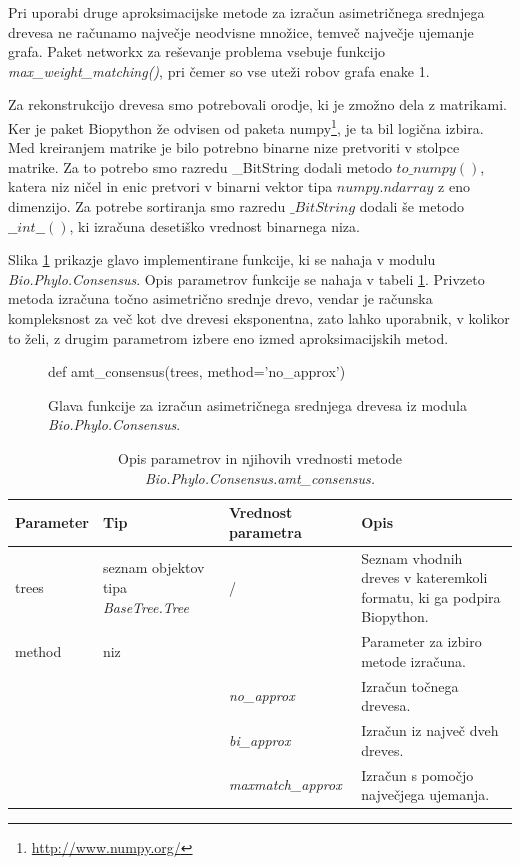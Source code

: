 \documentclass[a4paper, 12pt]{book}
\begin{document}
Pri uporabi druge aproksimacijske metode za izračun asimetričnega srednjega drevesa ne računamo največje neodvisne množice, 
temveč največje ujemanje grafa. Paket networkx za reševanje problema vsebuje funkcijo {\it max\_weight\_matching()}, pri čemer
so vse uteži robov grafa enake 1.

Za rekonstrukcijo drevesa smo potrebovali orodje, ki je zmožno dela z matrikami. Ker je paket Biopython že odvisen od paketa numpy\footnote{\url{http://www.numpy.org/}}, je ta bil logična izbira. Med kreiranjem matrike je bilo potrebno binarne nize pretvoriti v stolpce matrike. Za to potrebo smo razredu \_BitString dodali metodo $to\_numpy()$, katera niz ničel in enic pretvori v binarni vektor tipa $numpy.ndarray$ z eno dimenzijo. Za potrebe sortiranja smo razredu $\_BitString$ dodali še metodo $\_\_int\_\_()$, ki izračuna desetiško vrednost binarnega niza.

Slika \ref{code-amt-func} prikazje glavo implementirane funkcije, ki se nahaja v modulu {\it Bio.Phylo.Consensus}. Opis parametrov funkcije se nahaja v tabeli \ref{table-amt-head}. Privzeto metoda izračuna točno asimetrično srednje drevo, vendar je računska kompleksnost za več kot dve drevesi eksponentna, zato lahko uporabnik, v kolikor to želi, z drugim parametrom izbere eno izmed aproksimacijskih metod. 

\begin{figure}[h!]
	\begin{python}
		def amt_consensus(trees, method='no_approx')
	\end{python}
	\caption{Glava funkcije za izračun asimetričnega srednjega drevesa iz modula {\it Bio.Phylo.Consensus}.}
	\label{code-amt-func}
\end{figure}

\begin{table}
	\begin{center}
	{\footnotesize
    \begin{tabular}{ >{\centering}m{1.7cm} | >{\centering}m{2.9cm} | >{\centering}m{2.6cm} | >{\centering}m{4cm} } 
    Parameter & Tip                             & Vrednost parametra                        & Opis   \tabularnewline
    \hline
    trees     & seznam objektov tipa {\it BaseTree.Tree}           & /                      & Seznam vhodnih dreves v kateremkoli formatu, ki ga podpira Biopython.  \tabularnewline
    \hline
    \hline
    method    & niz                             &  ~                                        & Parameter za izbiro metode izračuna.  \tabularnewline
    ~         & ~                               & {\it no\_approx}                          & Izračun točnega drevesa.  \tabularnewline
    ~         & ~                               & {\it bi\_approx}                          & Izračun iz največ dveh dreves.  \tabularnewline
    ~         & ~                               & {\it maxmatch\_approx}                    & Izračun s pomočjo največjega ujemanja.  \tabularnewline
    \hline
    \end{tabular}
    }
    \caption{Opis parametrov in njihovih vrednosti metode {\it Bio.Phylo.Consensus.amt\_consensus.}}
    \label{table-amt-head}
	\end{center}    
\end{table}
\end{document}
